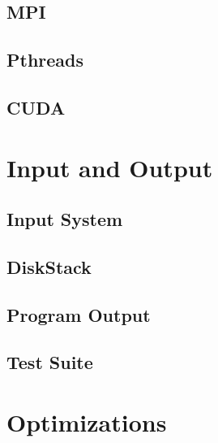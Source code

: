 \documentclass[paper=letter]{scrartcl}
\begin{document}
\subsection{MPI}
\subsection{Pthreads}
\subsection{CUDA}

\section{Input and Output}

\subsection{Input System}

\subsection{DiskStack}

\subsection{Program Output}

\subsection{Test Suite}

\section{Optimizations}
\end{document}
